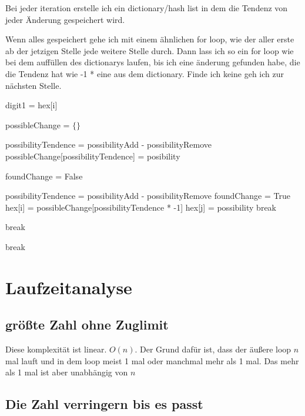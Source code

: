 \documentclass[a4paper,10pt,ngerman]{scrartcl}
\begin{document}
Bei jeder iteration erstelle ich ein dictionary/hash list in dem die Tendenz von jeder Änderung gespeichert wird. 

Wenn alles gespeichert gehe ich mit einem ähnlichen for loop, wie der aller erste ab der jetzigen Stelle jede weitere Stelle durch. Dann lass ich so ein for loop wie bei dem auffüllen des dictionarys laufen, bis ich eine änderung gefunden habe, die die Tendenz hat wie -1 * eine aus dem dictionary. Finde ich keine geh ich zur nächsten Stelle.

\begin{algorithmic}[1]
\State digit1 = hex[i]

\State possibleChange = $\{\}$

\State possibilityTendence = possibilityAdd - possibilityRemove
\State possibleChange[possibilityTendence] = posibility
\EndIf 
{}
\EndFor


\State foundChange = False

\State possibilityTendence = possibilityAdd - possibilityRemove
\State foundChange = True
\State hex[i] = possibleChange[possibilityTendence * -1]
\State hex[j] = possibility
\State break
\EndIf
\EndFor

\State break
\EndIf
\EndFor

\State break
\EndIf
\EndFor

\end{algorithmic}



\section{Laufzeitanalyse}

\subsection{größte Zahl ohne Zuglimit}

Diese komplexität ist linear. $O(n)$. Der Grund dafür ist, dass der äußere loop $n$ mal lauft und in dem loop meist 1 mal oder manchmal mehr als 1 mal. Das mehr als 1 mal ist aber unabhängig von $n$

\subsection{Die Zahl verringern bis es passt}
\end{document}

